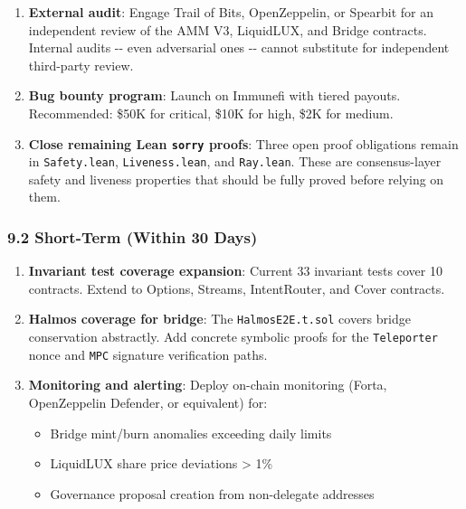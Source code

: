 \documentclass[
]{article}
\providecommand{\tightlist}{%
  \setlength{\itemsep}{0pt}\setlength{\parskip}{0pt}}
\begin{document}
\begin{enumerate}
\def\labelenumi{\arabic{enumi}.}
\item
  \textbf{External audit}: Engage Trail of Bits, OpenZeppelin, or
  Spearbit for an independent review of the AMM V3, LiquidLUX, and
  Bridge contracts. Internal audits -\/- even adversarial ones -\/-
  cannot substitute for independent third-party review.
\item
  \textbf{Bug bounty program}: Launch on Immunefi with tiered payouts.
  Recommended: \$50K for critical, \$10K for high, \$2K for medium.
\item
  \textbf{Close remaining Lean \texttt{sorry} proofs}: Three open proof
  obligations remain in \texttt{Safety.lean}, \texttt{Liveness.lean},
  and \texttt{Ray.lean}. These are consensus-layer safety and liveness
  properties that should be fully proved before relying on them.
\end{enumerate}

\subsubsection{9.2 Short-Term (Within 30
Days)}\label{92-short-term-within-30-days}

\begin{enumerate}
\def\labelenumi{\arabic{enumi}.}
\setcounter{enumi}{3}
\item
  \textbf{Invariant test coverage expansion}: Current 33 invariant tests
  cover 10 contracts. Extend to Options, Streams, IntentRouter, and
  Cover contracts.
\item
  \textbf{Halmos coverage for bridge}: The \texttt{HalmosE2E.t.sol}
  covers bridge conservation abstractly. Add concrete symbolic proofs
  for the \texttt{Teleporter} nonce and \texttt{MPC} signature
  verification paths.
\item
  \textbf{Monitoring and alerting}: Deploy on-chain monitoring (Forta,
  OpenZeppelin Defender, or equivalent) for:

  \begin{itemize}
  \tightlist
  \item
    Bridge mint/burn anomalies exceeding daily limits
  \item
    LiquidLUX share price deviations \textgreater{} 1\%
  \item
    Governance proposal creation from non-delegate addresses
  \end{itemize}
\end{enumerate}
\end{document}
